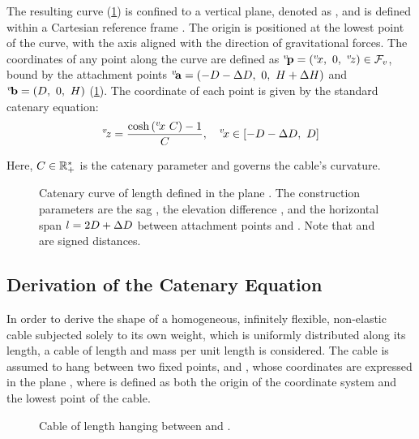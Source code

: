 The resulting curve (\cref{cm_cm_d_catenary_curve}) is confined to a vertical plane, denoted as
, and is defined within a Cartesian reference frame . The origin
 is positioned at the lowest point of the curve, with the  axis aligned
with the direction of gravitational forces. The coordinates of any point along the curve are
defined as $\fpoint{P}{v} = \left(\coord{x}{v},~0,~\coord{z}{v}\right) \in \lframe{v}$, bound by
the attachment points $\fpoint{A}{v}=\left(-\catD-\catdD,~0,~\catH+\catdH\right)$ and
$\fpoint{B}{v}=\left(\catD,~0,~\catH\right)$ (\cref{cm_cm_d_catenary_curve}). The 
coordinate of each point is given by the standard catenary equation:
\begin{align}
	\coord{z}{v} = \frac{\cosh{(\coord{x}{v}~\catC)} - 1}{\catC}, \quad \coord{x}{v} \in \left[-\catD-\catdD,~\catD\right]
	\label{cm_cm_d_catenary_equation}
\end{align}

Here, $C \in \mathbb{R}^*_+$ is the catenary parameter and governs the cable's curvature.

\begin{figure}
	\centering
	\caption{
		Catenary curve of length \catL{} defined in the plane . The construction parameters are
		the sag \catH{}, the elevation difference \catdH{}, and the horizontal span $l = 2D + \Delta D$
		between attachment points  and . Note that \catdD{} and \catdH{} are
		signed distances.
	}
	\label{cm_cm_d_catenary_curve}
\end{figure}

\subsection{Derivation of the Catenary Equation}
\label{cm_cm_derivation_of_the_catenary_equation}

In order to derive the shape of a homogeneous, infinitely flexible, non-elastic cable subjected
solely to its own weight, which is uniformly distributed along its length, a cable of length
\catL{} and mass per unit length  is considered. The cable is assumed to hang
between two fixed points,  and , whose coordinates are expressed in the
plane , where  is defined as both the origin of the coordinate system
and the lowest point of the cable.
\begin{figure}
	\centering
	\caption{
		Cable of length \catL{} hanging between  and .
	}
	\label{cm_cm_dotcm_schematic}
\end{figure}

